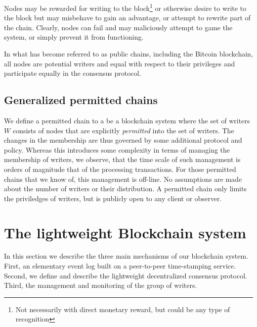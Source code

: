 \documentclass[10pt]{article}
\begin{document}
Nodes may be rewarded for writing to the block\footnote{Not necessarily with direct monetary reward, but could be any type of recognition} or otherwise desire to write to the block but may misbehave to gain an advantage, or attempt to rewrite part of the chain. Clearly, nodes can fail and may maliciously attempt to game the system, or simply prevent it from functioning.

In what has become referred to as public chains, including the Bitcoin blockchain, all nodes are potential writers and equal with respect to their privileges and participate equally in the consensus protocol.



\subsection{Generalized permitted chains}
We define a permitted chain to a be a blockchain system where the set of writers $W$ consists of nodes that are explicitly \emph{permitted} into the set of writers. The changes in the membership are thus governed by some additional protocol and policy. Whereas this introduces some complexity in terms of managing the membership of writers, we observe, that the time scale of such management is orders of magnitude that of the processing transactions. 
For those permitted chains that we know of, this management is off-line. No assumptions are made about the number of writers or their distribution. A permitted chain only limits the priviledges of writers, but is publicly open to any client or observer. 


\section{The lightweight Blockchain system}
\label{blockchain-system}
In this section we describe the three main mechanisms of our blockchain system. First, an elementary event log built on a peer-to-peer time-stamping service. Second, we define and describe the lightweight decentralized consensus protocol. Third, the management and monitoring of the group of writers.
\end{document}
